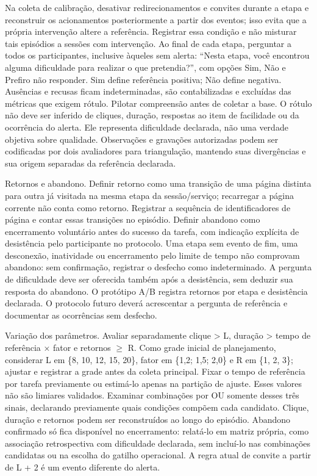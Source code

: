 \begin{apendicesenv}
Na coleta de calibração, desativar redirecionamentos e convites durante a etapa e reconstruir os acionamentos posteriormente a partir dos eventos; isso evita que a própria intervenção altere a referência. Registrar essa condição e não misturar tais episódios a sessões com intervenção. Ao final de cada etapa, perguntar a todos os participantes, inclusive àqueles sem alerta: ``Nesta etapa, você encontrou alguma dificuldade para realizar o que pretendia?'', com opções Sim, Não e Prefiro não responder. Sim define referência positiva; Não define negativa. Ausências e recusas ficam indeterminadas, são contabilizadas e excluídas das métricas que exigem rótulo. Pilotar compreensão antes de coletar a base. O rótulo não deve ser inferido de cliques, duração, respostas ao item de facilidade ou da ocorrência do alerta. Ele representa dificuldade declarada, não uma verdade objetiva sobre qualidade. Observações e gravações autorizadas podem ser codificadas por dois avaliadores para triangulação, mantendo suas divergências e sua origem separadas da referência declarada.

Retornos e abandono. Definir retorno como uma transição de uma página distinta para outra já visitada na mesma etapa da sessão/serviço; recarregar a página corrente não conta como retorno. Registrar a sequência de identificadores de página e contar essas transições no episódio. Definir abandono como encerramento voluntário antes do sucesso da tarefa, com indicação explícita de desistência pelo participante no protocolo. Uma etapa sem evento de fim, uma desconexão, inatividade ou encerramento pelo limite de tempo não comprovam abandono: sem confirmação, registrar o desfecho como indeterminado. A pergunta de dificuldade deve ser oferecida também após a desistência, sem deduzir sua resposta do abandono. O protótipo A/B registra retornos por etapa e desistência declarada. O protocolo futuro deverá acrescentar a pergunta de referência e documentar as ocorrências sem desfecho.

Variação dos parâmetros. Avaliar separadamente clique \textgreater{} L, duração \textgreater{} tempo de referência × fator e retornos \ensuremath{\geq} R. Como grade inicial de planejamento, considerar L em \{8, 10, 12, 15, 20\}, fator em \{1,2; 1,5; 2,0\} e R em \{1, 2, 3\}; ajustar e registrar a grade antes da coleta principal. Fixar o tempo de referência por tarefa previamente ou estimá-lo apenas na partição de ajuste. Esses valores não são limiares validados. Examinar combinações por OU somente desses três sinais, declarando previamente quais condições compõem cada candidato. Clique, duração e retornos podem ser reconstruídos ao longo do episódio. Abandono confirmado só fica disponível no encerramento: relatá-lo em matriz própria, como associação retrospectiva com dificuldade declarada, sem incluí-lo nas combinações candidatas ou na escolha do gatilho operacional. A regra atual de convite a partir de L + 2 é um evento diferente do alerta.


\end{apendicesenv}
